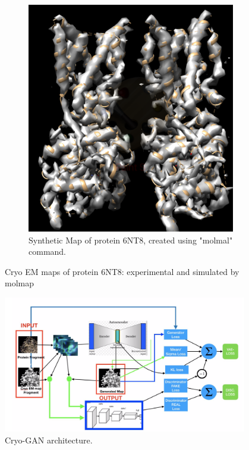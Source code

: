 \begin{figure}[!ht]
\begin{minipage}[b]{0.45\linewidth}
\begin{subfigure}[b]{\linewidth}
	\includegraphics[width=1.0\textwidth]{picsnew/6nt8_molmap.png}
	\caption{Synthetic Map of  protein 6NT8, created using "molmal" command.}
	\label{f:6nt8_molmap}
\end{subfigure}
\end{minipage}
\caption{Cryo EM maps of protein 6NT8: experimental and simulated by molmap }\label{f:6nt8}
\vspace{-3mm}
\end{figure}

\begin{figure}[!ht]
\includegraphics[width=0.95\textwidth]{picsnew/cryo_GAN.png}
\caption{Cryo-GAN architecture.}\label{f:cryo-GAN}
\end{figure}

